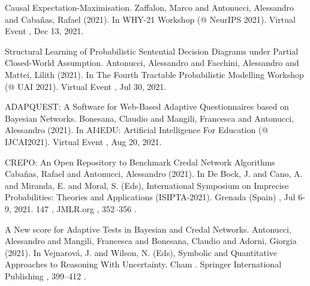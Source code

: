 

\begin{cventries}

\begin{cvitems}
\item Causal Expectation-Maximisation. Zaffalon, Marco and Antonucci, Alessandro and Cabañas, Rafael (2021).
In WHY-21 Workshop (@ NeurIPS 2021). Virtual Event , Dec 13, 2021. 
 
\item Structural Learning of Probabilistic Sentential Decision Diagrams under Partial Closed-World Assumption. Antonucci, Alessandro and Facchini, Alessandro and Mattei, Lilith (2021). In The Fourth Tractable Probabilistic Modelling Workshop (@ UAI 2021). Virtual Event , Jul 30, 2021. 

\item ADAPQUEST: A Software for Web-Based Adaptive Questionnaires based on Bayesian Networks. Bonesana, Claudio and Mangili, Francesca and Antonucci, Alessandro (2021).
In AI4EDU: Artificial Intelligence For Education (@ IJCAI2021). Virtual Event , Aug 20, 2021. 

\item CREPO: An Open Repository to Benchmark Credal Network Algorithms Cabañas, Rafael and Antonucci, Alessandro (2021). In De Bock, J. and Cano, A. and Miranda, E. and Moral, S. (Eds),  International Symposium on Imprecise Probabilities: Theories and Applications (ISIPTA-2021). Grenada (Spain) , Jul 6-9, 2021.   147 ,  JMLR.org , 352–356 . 

\item A New score for Adaptive Tests in Bayesian and Credal Networks. Antonucci, Alessandro and Mangili, Francesca and Bonesana, Claudio and Adorni, Giorgia (2021). In Vejnarová, J. and Wilson, N. (Eds),  Symbolic and Quantitative Approaches to Reasoning With Uncertainty. Cham .  Springer International Publishing , 399–412 . 


\end{cvitems}
\end{cventries}
